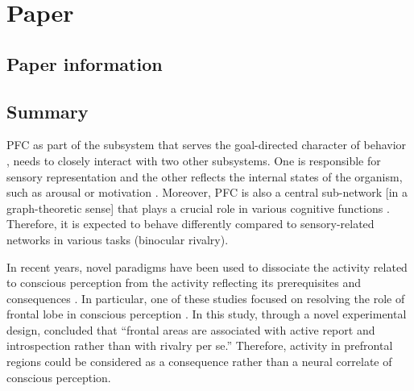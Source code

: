 \chapter{Paper } \label{cha:paper-safavi2014}
\section*{Paper information} %



\section*{Summary}


PFC as part of the subsystem that serves the goal-directed character of behavior 
\cite{logothetisStudiesLargeScaleNetworks2014},
needs to closely interact with two other subsystems. One is responsible for sensory representation and the other reflects the internal states of the organism,
such as arousal or motivation \cite{logothetisStudiesLargeScaleNetworks2014}.
Moreover, PFC is also a central sub-network [in a graph-theoretic sense]  \cite{modhaNetworkArchitectureLongdistance2010} that plays a crucial role in various cognitive functions \cite{millerIntegrativeTheoryPrefrontal2001}.
Therefore, it is expected to behave differently compared to sensory-related networks in various tasks (\eg binocular rivalry).

In recent years, novel paradigms have been used to dissociate the activity related to
conscious perception from the activity reflecting its prerequisites and consequences \cite{aruDistillingNeuralCorrelates2012,degraafCorrelatesNeuralCorrelates2012,tsuchiyaNoReportParadigmsExtracting2015}.
In particular, one of these studies focused on resolving the role of frontal lobe in conscious perception \cite{frassleBinocularRivalryFrontal2014}.
In this study, \citet{frassleBinocularRivalryFrontal2014} through a novel experimental design,
concluded that
``frontal areas are associated with active
report and introspection rather than with
rivalry per se.''
Therefore, activity in prefrontal regions could be considered as a consequence rather than a neural correlate of conscious perception.

